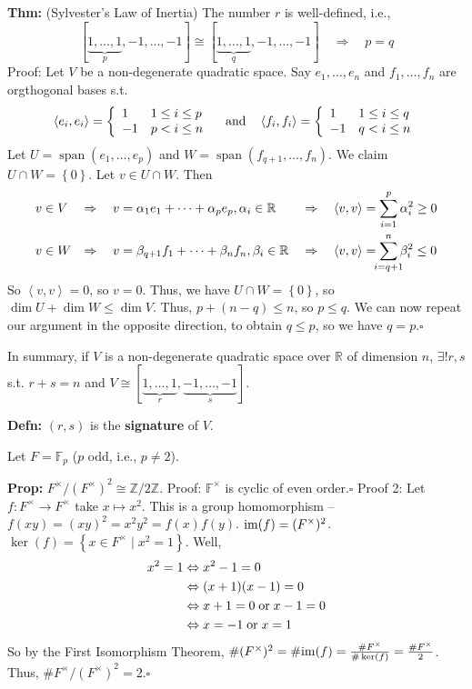 \documentclass[10pt,letterpaper]{article}
\newcommand{\n}{\hfill\break}
\newcommand{\hangblock}[2]{\par\noindent\settowidth{\hangindent}{\textbf{#1: }}\textbf{#1: }\!\!\!#2}
\newcommand{\defn}[1]{\hangblock{Defn}{#1}}
\newcommand{\thm}[1]{\hangblock{Thm}{#1}}
\newcommand{\prop}[1]{\hangblock{Prop}{#1}}
\newcommand{\proven}{\;$\square$\n}
\newcommand{\ptxt}[1]{\textrm{\textnormal{#1}}}
\newcommand{\set}[1]{\left\{#1\right\}}
\newcommand{\integers}{\mathbb{Z}}
\newcommand{\Z}{\integers}
\newcommand{\reals}{\mathbb{R}}
\newcommand{\R}{\reals}
\newcommand{\im}{\textrm{\textnormal{im}}}
\newcommand{\iprod}[1]{\left<#1\right>}
\DeclareMathOperator{\vspan}{span}
\newcommand{\F}{\mathbb{F}}
\newcommand{\st}{s.t.}
\newcommand{\unique}{!}
\begin{document}
\thm{
	(Sylvester's Law of Inertia) The number $r$ is well-defined, i.e.,
	\[
		[\underbrace{1,\ldots,1}_{p},-1,\ldots,-1]\cong[\underbrace{1,\ldots,1}_{q},-1,\ldots,-1]\quad\Rightarrow\quad{}p=q
	\]
	Proof: Let $V$ be a non-degenerate quadratic space. Say $e_{1},\ldots,e_{n}$ and $f_{1},\ldots,f_{n}$ are orgthogonal bases \st{}
	\[
		\iprod{e_{i},e_{i}}=\left\{\begin{array}{ll}
			1 & 1\le{}i\le{}p\\
			-1 & p<i\le{}n
		\end{array}\right.
		\quad\ptxt{and}\quad
		\iprod{f_{i},f_{i}}=\left\{\begin{array}{ll}
			1 & 1\le{}i\le{}q\\
			-1 & q<i\le{}n
		\end{array}\right.
	\]
	Let $U=\vspan(e_{1},\ldots,e_{p})$ and $W=\vspan(f_{q+1},\ldots,f_{n})$. We claim $U\cap{}W=\set{0}$.\n
	Let $v\in{}U\cap{}W$. Then
	\begin{align*}
		& v\in{}V{}\quad\Rightarrow\quad{}v=\alpha_{1}e_{1}+\cdots+\alpha_{p}e_{p},\alpha_{i}\in\R\qquad\Rightarrow\quad\iprod{v,v}=\sum_{i=1}^{p}\alpha_{i}^{2}\ge{}0\\
		& v\in{}\mathrlap{W}\phantom{V}\quad\Rightarrow\quad{}\mathrlap{v=\beta_{q+1}f_{1}+\cdots+\beta_{n}f_{n},\beta_{i}\in\R}\phantom{v=\alpha_{1}e_{1}+\cdots+\alpha_{p}e_{p},\alpha_{i}\in\R}\qquad\Rightarrow\quad\iprod{v,v}=\smashoperator{\sum_{i=q+1}^{n}}\beta_{i}^{2}\le{}0
	\end{align*}
	So $\iprod{v,v}=0$, so $v=0$.\n
	Thus, we have $U\cap{}W=\set{0}$, so $\dim{}U+\dim{}W\le{}\dim{}V$. Thus, $p+(n-q)\le{}n$, so $p\le{}q$. We can now repeat our argument in the opposite direction, to obtain $q\le{}p$, so we have $q=p$.\proven
}

\par\noindent
In summary, if $V$ is a non-degenerate quadratic space over $\R$ of dimension $n$, $\exists\unique{}r,s$ \st{} $r+s=n$ and $V\cong[\underbrace{1,\ldots,1}_{r},\underbrace{-1,\ldots,-1}_{s}]$.\n

\defn{
	$(r,s)$ is the \textbf{signature} of $V$.\n
}

\par\noindent
Let $F=\F_{p}$ ($p$ odd, i.e., $p\ne{}2$).\n

\prop{
	$F^{\times}/(F^{\times})^{2}\cong\Z/2\Z$.\n
	Proof: $\F^{\times}$ is cyclic of even order.\proven
	Proof 2: Let $f:F^{\times}\to{}F^{\times}$ take $x\mapsto{}x^{2}$.\n
	This is a group homomorphism -- $f(xy)=(xy)^{2}=x^{2}y^{2}=f(x)f(y)$.\n
	$\im(f)=(F^{\times})^{2}$. $\ker(f)=\set{x\in{}F^{\times}\mid{}x^{2}=1}$. Well,
	\begin{align*}
		x^{2}=1 & \Leftrightarrow{}x^{2}-1=0\\
		& \Leftrightarrow{}(x+1)(x-1)=0\\
		& \Leftrightarrow{}x+1=0\;\ptxt{or}\;{}x-1=0\\
		& \Leftrightarrow{}x=-1\;\ptxt{or}\;{}x=1
	\end{align*}
	So by the First Isomorphism Theorem, $\#(F^{\times})^{2}=\#\im(f)=\frac{\#{}F^{\times}}{\#\ker(f)}=\frac{\#F^{\times}}{2}$.\n
	Thus, $\#F^{\times}/(F^{\times})^{2}=2$.\proven
}
\end{document}
